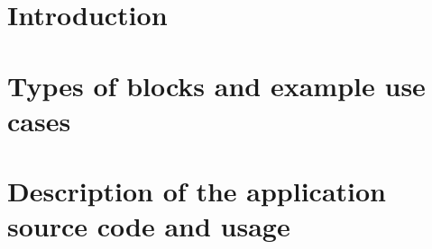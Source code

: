 \documentclass[12pt,a4paper]{report}
\begin{document}

\tableofcontents
\listoffigures

\chapter{Introduction}


\chapter{Types of blocks and example use cases}


\chapter{Description of the application source code and usage}

\end{document}
